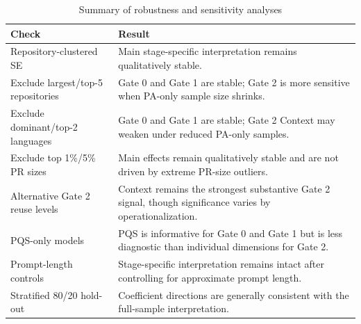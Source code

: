 \begin{table}
\caption{Summary of robustness and sensitivity analyses}
\label{tab:robustness-summary}
\begin{tabular}{ll}
\toprule
Check & Result \\
\midrule
Repository-clustered SE & Main stage-specific interpretation remains qualitatively stable. \\
Exclude largest/top-5 repositories & Gate 0 and Gate 1 are stable; Gate 2 is more sensitive when PA-only sample size shrinks. \\
Exclude dominant/top-2 languages & Gate 0 and Gate 1 are stable; Gate 2 Context may weaken under reduced PA-only samples. \\
Exclude top 1\%/5\% PR sizes & Main effects remain qualitatively stable and are not driven by extreme PR-size outliers. \\
Alternative Gate 2 reuse levels & Context remains the strongest substantive Gate 2 signal, though significance varies by operationalization. \\
PQS-only models & PQS is informative for Gate 0 and Gate 1 but is less diagnostic than individual dimensions for Gate 2. \\
Prompt-length controls & Stage-specific interpretation remains intact after controlling for approximate prompt length. \\
Stratified 80/20 hold-out & Coefficient directions are generally consistent with the full-sample interpretation. \\
\bottomrule
\end{tabular}
\end{table}
